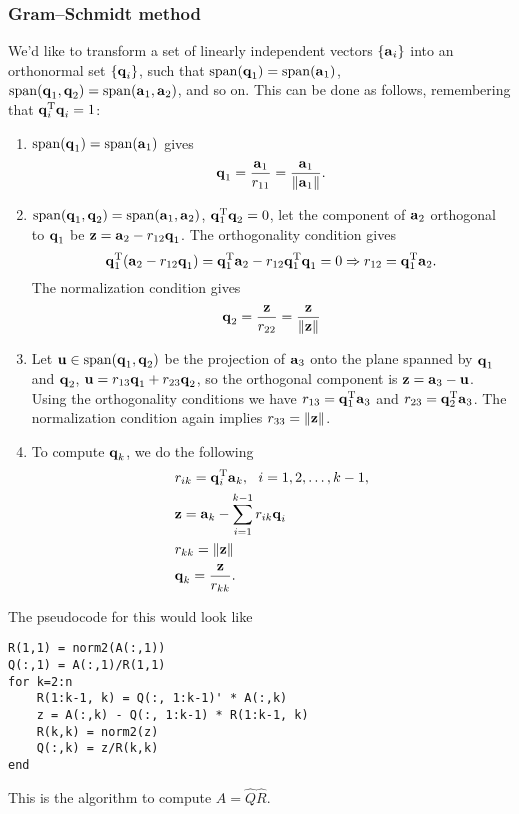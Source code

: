 \documentclass{article}
\begin{document}
\subsubsection{Gram--Schmidt method}
We'd like to transform a set of linearly independent vectors $\{\bm{\mathrm{a}}_i\}$ into an orthonormal set $\{\bm{\mathrm{q}}_i\}$, such that $\operatorname{span}(\bm{\mathrm{q}}_1)=\operatorname{span}(\bm{\mathrm{a}}_1)$, $\operatorname{span}(\bm{\mathrm{q}}_1,\bm{\mathrm{q}}_2)=\operatorname{span}(\bm{\mathrm{a}}_1,\bm{\mathrm{a}}_2)$, and so on. This can be done as follows, remembering that $\bm{\mathrm{q}}_i^{\text{T}}\bm{\mathrm{q}}_i=1$:
\begin{enumerate}
    \item $\operatorname{span}(\bm{\mathrm{q}}_1)=\operatorname{span}(\bm{\mathrm{a}}_1)$ gives
    \begin{equation}
        \bm{\mathrm{q}}_1=\frac{\bm{\mathrm{a}}_1}{r_{11}}=\frac{\bm{\mathrm{a}}_1}{\lVert\bm{\mathrm{a}}_1\rVert}.
    \end{equation}
    \item $\operatorname{span}(\bm{\mathrm{q}}_1,\bm{\mathrm{q}}_2)=\operatorname{span}(\bm{\mathrm{a}}_1,\bm{\mathrm{a}}_2)$, $\bm{\mathrm{q}}_1^{\text{T}}\bm{\mathrm{q}}_2=0$, let the component of $\bm{\mathrm{a}}_2$ orthogonal to $\bm{\mathrm{q}}_1$ be $\bm{\mathrm{z}}=\bm{\mathrm{a}}_2-r_{12}\bm{\mathrm{q}}_1$. The orthogonality condition gives
    \begin{equation}
        \bm{\mathrm{q}}_1^{\text{T}}(\bm{\mathrm{a}}_2-r_{12}\bm{\mathrm{q}}_1)=\bm{\mathrm{q}}_1^{\text{T}}\bm{\mathrm{a}}_2-r_{12}\bm{\mathrm{q}}_1^{\text{T}}\bm{\mathrm{q}}_1=0\Rightarrow r_{12}=\bm{\mathrm{q}}_1^{\text{T}}\bm{\mathrm{a}}_2.
    \end{equation}
    The normalization condition gives
    \begin{equation}
        \bm{\mathrm{q}}_2=\frac{\bm{\mathrm{z}}}{r_{22}}=\frac{\bm{\mathrm{z}}}{\lVert\bm{\mathrm{z}}\rVert}
    \end{equation}
    \item Let $\bm{\mathrm{u}}\in\operatorname{span}(\bm{\mathrm{q}}_1,\bm{\mathrm{q}}_2)$ be the projection of $\bm{\mathrm{a}}_3$ onto the plane spanned by $\bm{\mathrm{q}}_1$ and $\bm{\mathrm{q}}_2$, $\bm{\mathrm{u}}=r_{13}\bm{\mathrm{q}}_1+r_{23}\bm{\mathrm{q}}_2$, so the orthogonal component is $\bm{\mathrm{z}}=\bm{\mathrm{a}}_3-\bm{\mathrm{u}}$. Using the orthogonality conditions we have $r_{13}=\bm{\mathrm{q}}_1^{\text{T}}\bm{\mathrm{a}}_3$ and $r_{23}=\bm{\mathrm{q}}_2^{\text{T}}\bm{\mathrm{a}}_3$. The normalization condition again implies $r_{33}=\lVert\bm{\mathrm{z}}\rVert$.
    \item To compute $\bm{\mathrm{q}}_k$, we do the following 
    \begin{align}
        &r_{ik}=\bm{\mathrm{q}}_i^{\text{T}}\bm{\mathrm{a}}_k,\ \ i=1,2,\dots,k-1,\\
        &\bm{\mathrm{z}}=\bm{\mathrm{a}}_k-\sum_{i=1}^{k-1}r_{ik}\bm{\mathrm{q}}_i\\
        &r_{kk}=\lVert\bm{\mathrm{z}}\rVert\\
        &\bm{\mathrm{q}}_k=\frac{\bm{\mathrm{z}}}{r_{kk}}.
    \end{align}
\end{enumerate}
The pseudocode for this would look like
\begin{verbatim}
R(1,1) = norm2(A(:,1))
Q(:,1) = A(:,1)/R(1,1)
for k=2:n
    R(1:k-1, k) = Q(:, 1:k-1)' * A(:,k)
    z = A(:,k) - Q(:, 1:k-1) * R(1:k-1, k)
    R(k,k) = norm2(z)
    Q(:,k) = z/R(k,k)
end
\end{verbatim}
This is the algorithm to compute $A=\hat{Q}\hat{R}$.
\end{document}
